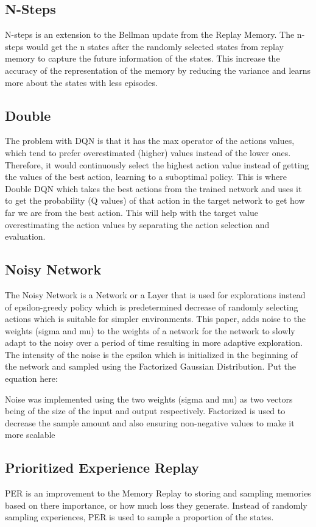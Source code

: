 \documentclass{article}
\begin{document}
\subsection{N-Steps}
N-steps is an extension to the Bellman update from the Replay Memory.
The n-steps would get the n states after the randomly selected states from replay memory to capture the future information of the states.
This increase the accuracy of the representation of the memory by reducing the variance and learns more about the states with less episodes.

\subsection{Double}
The problem with DQN is that it has the max operator of the actions values, which tend to prefer overestimated (higher) values instead of the lower ones.
Therefore, it would continuously select the highest action value instead of getting the values of the best action, learning to a suboptimal policy.
This is where Double DQN which takes the best actions from the trained network and uses it to get the probability (Q values) of that action in the target network to get how far we are from the best action.
This will help with the target value overestimating the action values by separating the action selection and evaluation.

\subsection{Noisy Network}
The Noisy Network is a Network or a Layer that is used for explorations instead of epsilon-greedy policy which is predetermined decrease of randomly selecting actions which is suitable for simpler environments.
This paper, adds noise to the weights (sigma and mu) to the weights of a network for the network to slowly adapt to the noisy over a period of time resulting in more adaptive exploration.
The intensity of the noise is the epsilon which is initialized in the beginning of the network and sampled using the Factorized Gaussian Distribution.
Put the equation here:

Noise was implemented using the two weights (sigma and mu) as two vectors being of the size of the input and output respectively.
Factorized is used to decrease the sample amount and also ensuring non-negative values to make it more scalable

\subsection{Prioritized Experience Replay}
PER is an improvement to the Memory Replay to storing and sampling memories based on there importance, or how much loss they generate.
Instead of randomly sampling experiences, PER is used to sample a proportion of the states.
\end{document}
